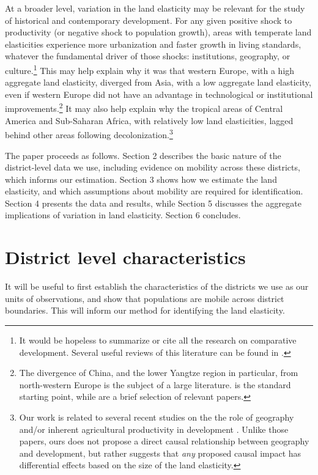 \documentclass[12pt]{article}
\begin{document}
At a broader level, variation in the land elasticity may be relevant for the study of historical and contemporary development. For any given positive shock to productivity (or negative shock to population growth), areas with temperate land elasticities experience more urbanization and faster growth in living standards, whatever the fundamental driver of those shocks: institutions, geography, or culture.\footnote{It would be hopeless to summarize or cite all the research on comparative development. Several useful reviews of this literature can be found in \cite{ajr2005handbook,nunn_2009,Galor:2011uq,sw2013,vries2013}.} This may help explain why it was that western Europe, with a high aggregate land elasticity, diverged from Asia, with a low aggregate land elasticity, even if western Europe did not have an advantage in technological or institutional improvements.\footnote{The divergence of China, and the lower Yangtze region in particular, from north-western Europe is the subject of a large literature. \citet{pom2000} is the standard starting point, while \citet{allen11,huang2002,ma2013,lee2002,bg2006} are a brief selection of relevant papers.} It may also help explain why the tropical areas of Central America and Sub-Saharan Africa, with relatively low land elasticities, lagged behind other areas following decolonization.\footnote{Our work is related to several recent studies on the the role of geography and/or inherent agricultural productivity in development \citep{oh2005,ashraf2010dynamics,Nunn2011,Nunn2012,mich2012,agn2013,cook14,cook2014role,fenske2014,alsan2015,ashrafmich2015,dks2015,galorozak2016,litina2016,ads2016,FrankemaPap2017}. Unlike those papers, ours does not propose a direct causal relationship between geography and development, but rather suggests that \textit{any} proposed causal impact has differential effects based on the size of the land elasticity.} 

The paper proceeds as follows. Section 2 describes the basic nature of the district-level data we use, including evidence on mobility across these districts, which informs our estimation. Section 3 shows how we estimate the land elasticity, and which assumptions about mobility are required for identification. Section 4 presents the data and results, while Section 5 discusses the aggregate implications of variation in land elasticity. Section 6 concludes.

\section{District level characteristics}
It will be useful to first establish the characteristics of the districts we use as our units of observations, and show that populations are mobile across district boundaries. This will inform our method for identifying the land elasticity.
\end{document}
